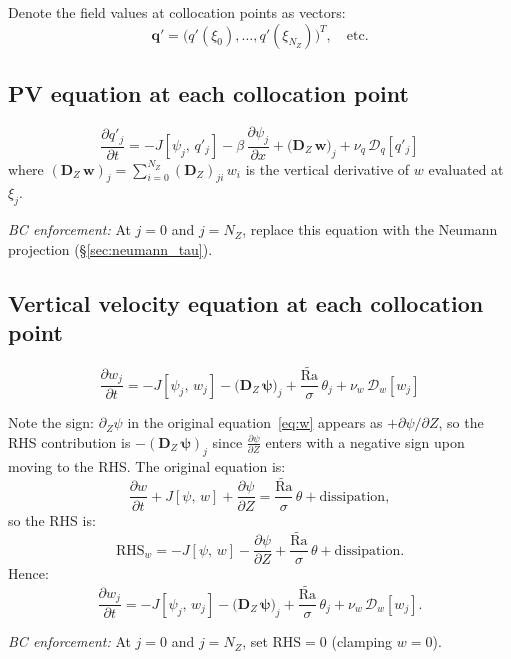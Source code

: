 \documentclass[11pt]{article}
\newcommand{\pderiv}[2]{\frac{\partial #1}{\partial #2}}
\newcommand{\Rav}{\widetilde{\mathrm{Ra}}}
\newcommand{\Jac}[2]{J\!\left[#1,\,#2\right]}
\newcommand{\Dvec}{\bm{D}}
\begin{document}
Denote the field values at collocation points as vectors:
\begin{equation}
\bm{q}' = \big(q'(\xi_0), \ldots, q'(\xi_{N_Z})\big)^T, \quad \text{etc.}
\end{equation}

\subsection{PV equation at each collocation point}

\begin{equation}
\boxed{
\pderiv{q'_j}{t} = -\Jac{\psi_j}{q'_j} - \beta\,\pderiv{\psi_j}{x} + \big(\Dvec_Z\,\bm{w}\big)_j + \nu_q\,\mathcal{D}_q[q'_j]
}
\label{eq:pv_colloc}
\end{equation}
where $(\Dvec_Z\,\bm{w})_j = \sum_{i=0}^{N_Z} (\Dvec_Z)_{ji}\, w_i$ is the vertical derivative of $w$ evaluated at $\xi_j$.

\emph{BC enforcement:} At $j = 0$ and $j = N_Z$, replace this equation with the Neumann projection (\S\ref{sec:neumann_tau}).

\subsection{Vertical velocity equation at each collocation point}

\begin{equation}
\boxed{
\pderiv{w_j}{t} = -\Jac{\psi_j}{w_j} - \big(\Dvec_Z\,\bm{\psi}\big)_j + \frac{\Rav}{\sigma}\,\theta_j + \nu_w\,\mathcal{D}_w[w_j]
}
\label{eq:w_colloc}
\end{equation}

Note the sign: $\partial_Z\psi$ in the original equation~\eqref{eq:w} appears as $+\partial\psi/\partial Z$, so the RHS contribution is $-(\Dvec_Z\,\bm{\psi})_j$ since $\pderiv{\psi}{Z}$ enters with a negative sign upon moving to the RHS. The original equation is:
\[
\pderiv{w}{t} + \Jac{\psi}{w} + \pderiv{\psi}{Z} = \frac{\Rav}{\sigma}\,\theta + \mathrm{dissipation},
\]
so the RHS is:
\[
\text{RHS}_w = -\Jac{\psi}{w} - \pderiv{\psi}{Z} + \frac{\Rav}{\sigma}\,\theta + \mathrm{dissipation}.
\]
Hence:
\begin{equation}
\pderiv{w_j}{t} = -\Jac{\psi_j}{w_j} - \big(\Dvec_Z\,\bm{\psi}\big)_j + \frac{\Rav}{\sigma}\,\theta_j + \nu_w\,\mathcal{D}_w[w_j].
\label{eq:w_colloc2}
\end{equation}

\emph{BC enforcement:} At $j = 0$ and $j = N_Z$, set $\text{RHS} = 0$ (clamping $w = 0$).
\end{document}
